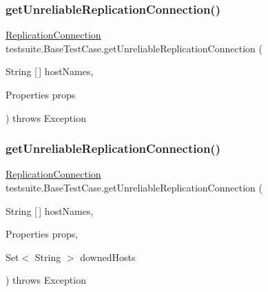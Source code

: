 \subsubsection{\texorpdfstring{get\+Unreliable\+Replication\+Connection()}{getUnreliableReplicationConnection()}\hspace{0.1cm}{\footnotesize\ttfamily [1/3]}}
{\footnotesize\ttfamily \mbox{\hyperlink{interfacecom_1_1mysql_1_1cj_1_1jdbc_1_1ha_1_1_replication_connection}{Replication\+Connection}} testsuite.\+Base\+Test\+Case.\+get\+Unreliable\+Replication\+Connection (\begin{DoxyParamCaption}\item[{String \mbox{[}$\,$\mbox{]}}]{host\+Names,  }\item[{Properties}]{props }\end{DoxyParamCaption}) throws Exception\hspace{0.3cm}{\ttfamily [protected]}}

\mbox{\label{classtestsuite_1_1_base_test_case_add2c34fed4dd457540016f9d22a6fcb2}} 
\subsubsection{\texorpdfstring{get\+Unreliable\+Replication\+Connection()}{getUnreliableReplicationConnection()}\hspace{0.1cm}{\footnotesize\ttfamily [2/3]}}
{\footnotesize\ttfamily \mbox{\hyperlink{interfacecom_1_1mysql_1_1cj_1_1jdbc_1_1ha_1_1_replication_connection}{Replication\+Connection}} testsuite.\+Base\+Test\+Case.\+get\+Unreliable\+Replication\+Connection (\begin{DoxyParamCaption}\item[{String \mbox{[}$\,$\mbox{]}}]{host\+Names,  }\item[{Properties}]{props,  }\item[{Set$<$ String $>$}]{downed\+Hosts }\end{DoxyParamCaption}) throws Exception\hspace{0.3cm}{\ttfamily [protected]}}

\mbox{\label{classtestsuite_1_1_base_test_case_a343014aac2808c32fbadb0f42a22f77d}} 
